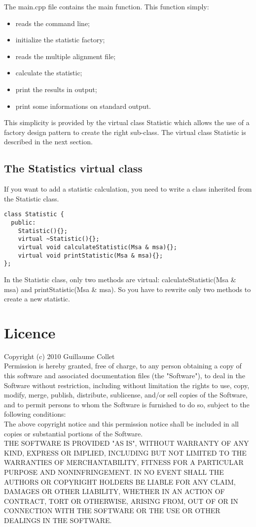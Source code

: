 \documentclass[12pt]{report}
\begin{document}
The main.cpp file contains the main function. This function simply:
\begin{itemize}
\item reads the command line;
\item initialize the statistic factory;
\item reads the multiple alignment file;
\item calculate the statistic;
\item print the results in output;
\item print some informations on standard output.\\
\end{itemize}

This simplicity is provided by the virtual class Statistic which allows the use of a factory design pattern 
to create the right sub-class. The virtual class Statistic is described in the next section.

\subsection{The Statistics virtual class}
\label{cla_sec}
If you want to add a statistic calculation, you need to write a class inherited from the Statistic class.
\begin{verbatim}
class Statistic {
  public:
    Statistic(){};
    virtual ~Statistic(){};
    virtual void calculateStatistic(Msa & msa){};
    virtual void printStatistic(Msa & msa){};
};
\end{verbatim}
In the Statistic class, only two methods are virtual: calculateStatistic(Msa \& msa) and printStatistic(Msa \& msa).
So you have to rewrite only two methods to create a new statistic. 




\newpage
\section*{Licence}
Copyright (c) 2010 Guillaume Collet\\
 
Permission is hereby granted, free of charge, to any person obtaining a copy
of this software and associated documentation files (the "Software"), to deal
in the Software without restriction, including without limitation the rights
to use, copy, modify, merge, publish, distribute, sublicense, and/or sell
copies of the Software, and to permit persons to whom the Software is
furnished to do so, subject to the following conditions:\\

The above copyright notice and this permission notice shall be included in
all copies or substantial portions of the Software. \\

THE SOFTWARE IS PROVIDED "AS IS", WITHOUT WARRANTY OF ANY KIND, EXPRESS OR
IMPLIED, INCLUDING BUT NOT LIMITED TO THE WARRANTIES OF MERCHANTABILITY,
FITNESS FOR A PARTICULAR PURPOSE AND NONINFRINGEMENT. IN NO EVENT SHALL THE
AUTHORS OR COPYRIGHT HOLDERS BE LIABLE FOR ANY CLAIM, DAMAGES OR OTHER
LIABILITY, WHETHER IN AN ACTION OF CONTRACT, TORT OR OTHERWISE, ARISING FROM,
OUT OF OR IN CONNECTION WITH THE SOFTWARE OR THE USE OR OTHER DEALINGS IN
THE SOFTWARE. 
\end{document}
